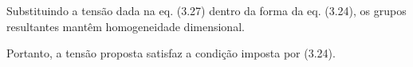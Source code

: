 Substituindo a tensão dada na eq. (3.27) dentro da forma da eq. (3.24), os grupos resultantes mantêm homogeneidade dimensional.

Portanto, a tensão proposta satisfaz a condição imposta por (3.24).

